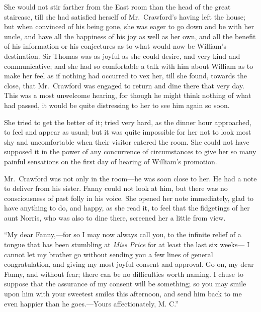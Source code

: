 \documentclass{article}
\begin{document}
She would not stir farther from the East room than
the head of the great staircase, till she had satisfied
herself of Mr.\ Crawford's having left the house;
but when convinced of his being gone, she was eager to go
down and be with her uncle, and have all the happiness
of his joy as well as her own, and all the benefit
of his information or his conjectures as to what would
now be William's destination.  Sir Thomas was as joyful
as she could desire, and very kind and communicative;
and she had so comfortable a talk with him about William
as to make her feel as if nothing had occurred to vex her,
till she found, towards the close, that Mr.\ Crawford
was engaged to return and dine there that very day.
This was a most unwelcome hearing, for though he might
think nothing of what had passed, it would be quite
distressing to her to see him again so soon.

She tried to get the better of it; tried very hard,
as the dinner hour approached, to feel and appear as usual;
but it was quite impossible for her not to look most shy
and uncomfortable when their visitor entered the room.
She could not have supposed it in the power of any concurrence
of circumstances to give her so many painful sensations on
the first day of hearing of William's promotion.

Mr.\ Crawford was not only in the room---he was soon close
to her.  He had a note to deliver from his sister.
Fanny could not look at him, but there was no consciousness
of past folly in his voice.  She opened her note immediately,
glad to have anything to do, and happy, as she read it,
to feel that the fidgetings of her aunt Norris, who was
also to dine there, screened her a little from view.

``My dear Fanny,---for so I may now always call you,
to the infinite relief of a tongue that has been stumbling
at \emph{Miss} \emph{Price} for at least the last six weeks---%
I cannot let my brother go without sending you a few lines
of general congratulation, and giving my most joyful consent
and approval.  Go on, my dear Fanny, and without fear;
there can be no difficulties worth naming.  I chuse to
suppose that the assurance of my consent will be something;
so you may smile upon him with your sweetest smiles
this afternoon, and send him back to me even happier
than he goes.---Yours affectionately, M. C.''
\end{document}
